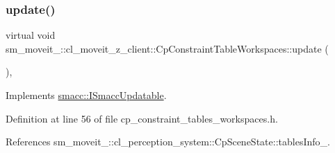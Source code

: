 \subsubsection{\texorpdfstring{update()}{update()}}
{\footnotesize\ttfamily virtual void sm\+\_\+moveit\+\_\+::cl\+\_\+moveit\+\_\+z\+\_\+client\+::\+Cp\+Constraint\+Table\+Workspaces\+::update (\begin{DoxyParamCaption}{ }\end{DoxyParamCaption})\hspace{0.3cm}{\ttfamily [inline]}, {\ttfamily [virtual]}}



Implements \hyperlink{classsmacc_1_1ISmaccUpdatable_a84ee0520cbefdb1d412bed54650b028e}{smacc\+::\+I\+Smacc\+Updatable}.



Definition at line 56 of file cp\+\_\+constraint\+\_\+tables\+\_\+workspaces.\+h.



References sm\+\_\+moveit\+\_\+::cl\+\_\+perception\+\_\+system\+::\+Cp\+Scene\+State\+::tables\+Info\+\_\+.


